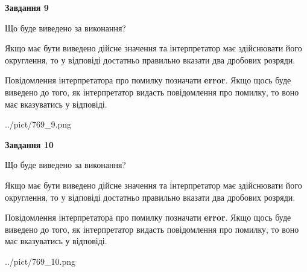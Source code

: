 \documentclass[12pt, ukrainian]{article}
\begin{document}
{\begin {Large}
{\begin {center}\textbf{Завдання 9}\end {center}}\par
Що буде виведено за виконання? \par

Якщо має бути виведено дійсне значення та інтерпретатор має здійснювати його округлення, 
то у відповіді достатньо правильно вказати два дробових розряди.

Повідомлення інтерпретатора про помилку позначати \textbf{error}.
Якщо щось буде виведено до того, як інтерпретатор видасть повідомлення про помилку, 
то воно має вказуватись у відповіді. \par

\begin{center}
	{../pict/769_9.png}
\end{center}
\newpage

{\begin {center}\textbf{Завдання 10}\end {center}}\par
Що буде виведено за виконання? \par

Якщо має бути виведено дійсне значення та інтерпретатор має здійснювати його округлення, 
то у відповіді достатньо правильно вказати два дробових розряди.

Повідомлення інтерпретатора про помилку позначати \textbf{error}.
Якщо щось буде виведено до того, як інтерпретатор видасть повідомлення про помилку, 
то воно має вказуватись у відповіді. \par

\begin{center}
	{../pict/769_10.png}
\end{center}
\newpage

\end {Large}}
\end{document}
